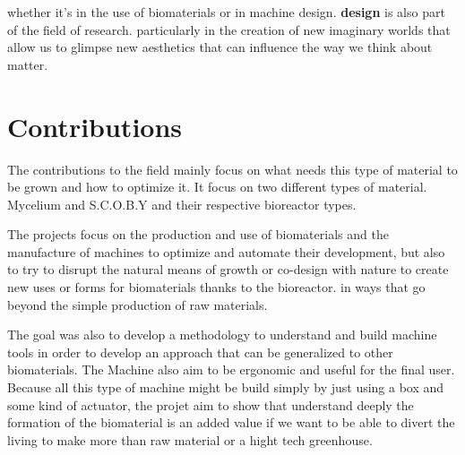 whether it's in the use of biomaterials or in machine design. \textbf{design} is also part of the field of research. particularly in the creation of new imaginary worlds that allow us to glimpse new aesthetics that can influence the way we think about matter. 



\section{Contributions}

The contributions to the field mainly focus on what needs this type of material to be grown and how to optimize it.
It focus on two different types of material. Mycelium and S.C.O.B.Y and their respective bioreactor types. 

The projects focus on the production and use of biomaterials and the manufacture of machines to optimize and automate their development, but also to try to disrupt the natural means of growth or co-design with nature to create new uses or forms for biomaterials thanks to the bioreactor. in ways that go beyond the simple production of raw materials.

The goal was also to develop a methodology to understand and build machine tools in order to develop an approach that can be generalized to other biomaterials.
The Machine also aim to be ergonomic and useful for the final user. Because all this type of machine might be build simply by just using a box and some kind of actuator, the projet aim to show that understand deeply the formation of the biomaterial is an added value if we want to be able to divert the living to make more than raw material or a hight tech greenhouse. 
